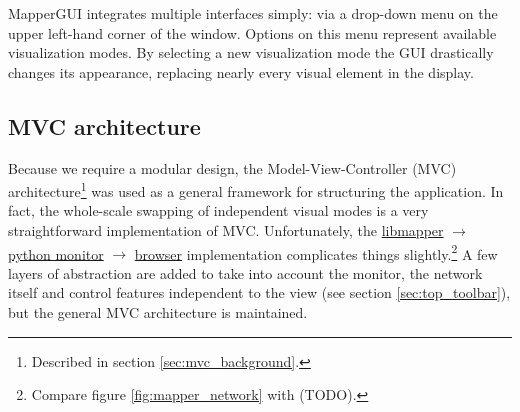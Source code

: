 MapperGUI integrates multiple interfaces simply: via a drop-down menu on the upper left-hand corner of the window. Options on this menu represent available visualization modes. By selecting a new visualization mode the GUI drastically changes its appearance, replacing nearly every visual element in the display.

	\subsection{MVC architecture} %
	\label{sec:mvc_architecture}

Because we require a modular design, the Model-View-Controller (MVC) architecture\footnote{Described in section \ref{sec:mvc_background}.} was used as a general framework for structuring the application. In fact, the whole-scale swapping of independent visual modes is a very straightforward implementation of MVC. Unfortunately, the \url{libmapper} $\rightarrow$ \url{python monitor} $\rightarrow$ \url{browser} implementation complicates things slightly.\footnote{Compare figure \ref{fig:mapper_network} with (TODO).} A few layers of abstraction are added to take into account the monitor, the network itself and control features independent to the view (see section \ref{sec:top_toolbar}), but the general MVC architecture is maintained.

